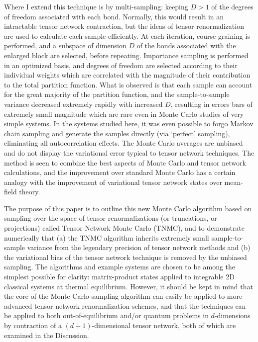 \documentclass[aps,prl,nopacs,twocolumn]{revtex4}
\begin{document}
Where I extend this technique is by multi-sampling: keeping $D > 1$ of the degrees of freedom associated with each bond. Normally, this would result in an intractable tensor network contraction, but the ideas of tensor renormalization are used to calculate each sample efficiently.  At each iteration, course graining is performed, and a subspace of dimension $D$ of the bonds associated with the enlarged block are selected, before repeating. Importance sampling is performed in an optimized basis, and degrees of freedom are selected according to their individual weights which are correlated with the magnitude of their contribution to the total partition function. What is observed is that each sample can account for the great majority of the partition function, and the sample-to-sample variance decreased extremely rapidly with increased $D$, resulting in errors bars of extremely small magnitude which are rare even in Monte Carlo studies of very simple systems. In the systems studied here, it was even possible to forgo Markov chain sampling and generate the samples directly (via `perfect' sampling), eliminating all autocorrelation effects. The Monte Carlo averages are unbiased and do not display the variational error typical to tensor network techniques. The method is seen to combine the best aspects of Monte Carlo and tensor network calculations, and the improvement over standard Monte Carlo has a certain analogy with the improvement of variational tensor network states over mean-field theory.

The purpose of this paper is to outline this new Monte Carlo algorithm based on sampling over the space of tensor renormalizations (or truncations, or projections) called Tensor Network Monte Carlo (TNMC), and to demonstrate numerically that (a) the TNMC algorithm inherits extremely small sample-to-sample variance from the legendary precision of tensor network methods and (b) the variational bias of the tensor network technique is removed by the unbiased sampling. The algorithms and example systems are chosen to be among the simplest possible for clarity: matrix-product states applied to integrable 2D classical systems at thermal equilibrium. However, it should be kept in mind that the core of the Monte Carlo sampling algorithm can easily be applied to more advanced tensor network renormalization schemes, and that the techniques can be applied to both out-of-equilibrium and/or quantum problems in $d$-dimensions by contraction of a $(d+1)$-dimensional tensor network, both of which are examined in the Discussion.
\end{document}
